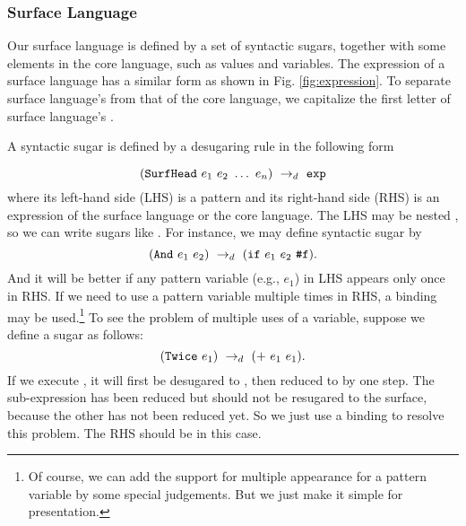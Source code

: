 
\subsubsection{Surface Language}
\label{mark:suflang}

Our surface language is defined by a set of syntactic sugars, together with some elements in the core language, such as values and variables. The expression of a surface language has a similar form as shown in Fig.  \ref{fig:expression}. To separate surface language's  from that of the core language, we capitalize the first letter of surface language's .

A syntactic sugar  is defined by a desugaring rule in the following form

\[
\drule{(\m{SurfHead}~e_1~e_2~\ldots~e_n)}{\m{exp}} %
\]
where its left-hand side (LHS) is a pattern and its right-hand side (RHS) is an expression of the surface language or the core language. The LHS may be nested , so we can write sugars like . For instance, we may define syntactic sugar  by
\[
(\mbox{\tt And}~e_1~e_2) ~\rightarrow_d~ (\mbox{\tt if}~e_1~e_2~\mbox{\tt \#f}).
\]
And it will be better if any pattern variable (e.g., $e_1$) in LHS appears only once in RHS.
If we need to use a pattern variable multiple times in RHS, a  binding may be used.\footnote{Of course, we can add the support for multiple appearance for a pattern variable by some special judgements. But we just make it simple for presentation.} To see the problem of multiple uses of a variable, suppose we define a sugar as follows:
\[
(\mbox{\tt Twice}~e_1) ~\rightarrow_d~ (+~e_1~e_1).
\]
If we execute , it will first be desugared to , then reduced to  by one step. The sub-expression  has been reduced but should not be resugared to the surface, because the other  has not been reduced yet.
So we just use a  binding to resolve this problem. The RHS should be  in this case.


